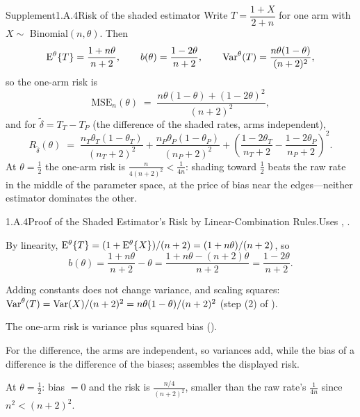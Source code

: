 \documentclass[main.tex]{subfiles}
\begin{document}
\begin{ObjL}{Supplement}{1.A.4}{Risk of the shaded estimator}
Write $T=\dfrac{1+X}{2+n}$ for one arm with $X\sim$ Binomial$(n,\theta)$. Then
\[ \mathrm{E}^{\theta}\{T\}=\frac{1+n\theta}{n+2},\qquad
   b(\theta)=\frac{1-2\theta}{n+2},\qquad
   \operatorname{Var}^{\theta}(T)=\frac{n\theta(1-\theta)}{(n+2)^2}, \]
so the one-arm risk is
\[ \mathrm{MSE}_n(\theta) \;=\; \frac{n\theta(1-\theta)+(1-2\theta)^2}{(n+2)^2} , \]
and for $\tilde\delta = T_T - T_P$ (the difference of the shaded rates, arms independent),
\[ R_{\tilde\delta}(\theta) \;=\;
   \frac{n_T\theta_T(1-\theta_T)}{(n_T+2)^2}+\frac{n_P\theta_P(1-\theta_P)}{(n_P+2)^2}
   +\left(\frac{1-2\theta_T}{n_T+2}-\frac{1-2\theta_P}{n_P+2}\right)^{\!2}. \]
At $\theta=\tfrac12$ the one-arm risk is $\tfrac{n}{4(n+2)^2}<\tfrac{1}{4n}$: shading toward
$\tfrac12$ beats the raw rate in the middle of the parameter space, at the price of bias near
the edges---neither estimator dominates the other.
\end{ObjL}
\begin{Prf}{1.A.4}{Proof of the Shaded Estimator's Risk by Linear-Combination Rules.}{Uses , .}
\item By linearity, $\mathrm{E}^{\theta}\{T\}=(1+\mathrm{E}^{\theta}\{X\})/(n+2)=(1+n\theta)/(n+2)$, so
      \[ b(\theta)=\frac{1+n\theta}{n+2}-\theta=\frac{1+n\theta-(n+2)\theta}{n+2}
      =\frac{1-2\theta}{n+2} . \]
\item Adding constants does not change variance, and scaling squares:
      $\operatorname{Var}^{\theta}(T)=\operatorname{Var}(X)/(n+2)^2=n\theta(1-\theta)/(n+2)^2$ (step (2) of ).
\item The one-arm risk is variance plus squared bias ().
\item For the difference, the arms are independent, so variances add, while the bias of a
      difference is the difference of the biases;  assembles the displayed risk.
\item At $\theta=\tfrac12$: bias $=0$ and the risk is $\tfrac{n/4}{(n+2)^2}$, smaller than the
      raw rate's $\tfrac{1}{4n}$ since $n^2<(n+2)^2$.
\end{Prf}
\end{document}
